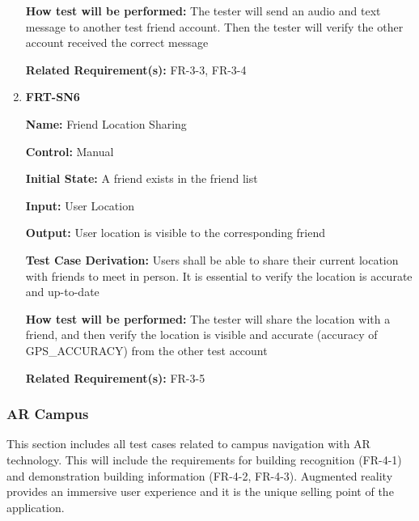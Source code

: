 \documentclass[12pt, titlepage]{article}
\begin{document}
\begin{enumerate}
\textbf{How test will be performed:} The tester will send an audio and text message to another test friend account. Then the tester will verify the other account received the correct message

\textbf{Related Requirement(s):} FR-3-3, FR-3-4

\item{\textbf{FRT-SN6}}

\textbf{Name:} Friend Location Sharing

\textbf{Control:} Manual
					
\textbf{Initial State:} A friend exists in the friend list

\textbf{Input:} User Location
					
\textbf{Output:} User location is visible to the corresponding friend

\textbf{Test Case Derivation:} Users shall be able to share their current location with friends to meet in person. It is essential to verify the location is accurate and up-to-date
					
\textbf{How test will be performed:} The tester will share the location with a friend, and then verify the location is visible and accurate (accuracy of GPS\_ACCURACY) from the other test account

\textbf{Related Requirement(s):} FR-3-5
\end{enumerate}

\subsubsection{AR Campus}

This section includes all test cases related to campus navigation with AR technology. This will include the requirements for building recognition (FR-4-1) and demonstration building information (FR-4-2, FR-4-3). Augmented reality provides an immersive user experience and it is the unique selling point of the application.
\end{document}
